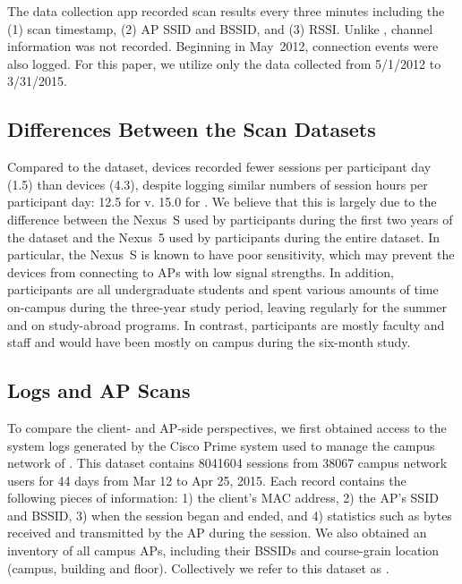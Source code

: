 The \NetSense{} data collection app recorded scan results every three
minutes including the (1) scan timestamp, (2) AP SSID and BSSID, and (3) RSSI.
Unlike \ubscan{}, channel information was not recorded.  Beginning in May~2012,
\wifi{} connection events were also logged. For this paper, we utilize only the
data collected from 5/1/2012 to 3/31/2015.

\subsection{Differences Between the Scan Datasets}


Compared to the \ubscan{} dataset, \NetSense{} devices recorded fewer sessions
per participant day (1.5) than \PhoneLab{} devices (4.3), despite logging
similar numbers of session hours per participant day: 12.5 for \ndscan{} v. 15.0
for \ubscan{}. We believe that this is largely due to the difference between the
Nexus~S used by \NetSense{} participants during the first two years of the
\ndscan{} dataset and the Nexus~5 used by \PhoneLab{} participants during the
entire \ubscan{} dataset. In particular, the Nexus~S is known to have poor
\wifi{} sensitivity, which may prevent the devices from connecting to APs with
low signal strengths. In addition, \NetSense{} participants are all
undergraduate students and spent various amounts of time on-campus during the
three-year study period, leaving regularly for the summer and on study-abroad
programs. In contrast, \PhoneLab{} participants are mostly faculty and staff and
would have been mostly on campus during the six-month study.

\subsection{\ub{} \wifi{} Logs and AP Scans}
\label{subsec:cit}

To compare the client- and AP-side perspectives, we first obtained access to the
system logs generated by the Cisco Prime system used to manage
the campus \wifi{} network of \ub{}. This dataset contains \num{8041604} \wifi{}
sessions from \num{38067} \ub{} campus network users for 44 days from Mar 12 to
Apr 25, 2015. Each record contains the following pieces of information: 1) the client's MAC
address, 2) the AP's SSID and BSSID, 3) when the \wifi{} session began and
ended, and 4) statistics such as bytes received and transmitted by the AP during
the session. We also obtained an inventory of all \ub{} campus APs, including
their BSSIDs and course-grain location (campus, building and floor).
Collectively we refer to this dataset as \textbf{\ubap{}}.

